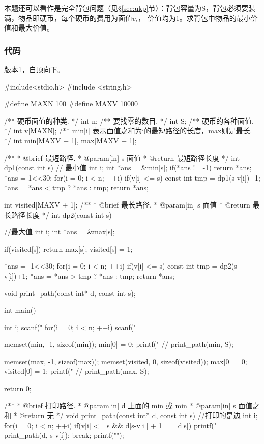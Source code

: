 本题还可以看作是完全背包问题（见\S \ref{sec:ukp}节）：背包容量为S，背包必须要装满，物品即硬币，每个硬币的费用为面值$v_i$，
价值均为1。求背包中物品的最小价值和最大价值。

\subsubsection{代码}
版本1，自顶向下。

\begin{Codex}[label=coin_change.c]
#include<stdio.h>
#include <string.h>

#define MAXN 100
#define MAXV 10000

/** 硬币面值的种类. */
int n;
/** 要找零的数目. */
int S;
/** 硬币的各种面值. */
int v[MAXN];
/** min[i] 表示面值之和为i的最短路径的长度，max则是最长. */
int min[MAXV + 1], max[MAXV + 1];

/**
 * @brief 最短路径.
 * @param[in] s 面值
 * @return 最短路径长度
 */
int dp1(const int s) { // 最小值
    int i;
    int *ans = &min[s];
    if(*ans != -1) return *ans;
    *ans = 1<<30;
    for(i = 0; i < n; ++i) if(v[i] <= s) {
        const int tmp = dp1(s-v[i])+1;
        *ans = *ans < tmp ? *ans : tmp;
    }
    return *ans;
}

int visited[MAXV + 1];
/**
 * @brief 最长路径.
 * @param[in] s 面值
 * @return 最长路径长度
 */
int dp2(const int s) { //最大值 
    int i;
    int *ans = &max[s];

    if(visited[s]) return max[s];
    visited[s] = 1;

    *ans = -1<<30;
    for(i = 0; i < n; ++i) if(v[i] <= s) {
        const int tmp = dp2(s-v[i])+1;
        *ans = *ans > tmp ? *ans : tmp;
    }
    return *ans;
}

void print_path(const int* d, const int s);

int main() {
    int i;
    scanf("%
    for(i = 0; i < n; ++i) scanf("%

    memset(min, -1, sizeof(min));
    min[0] = 0;
    printf("%
    // print_path(min, S);

    memset(max, -1, sizeof(max));
    memset(visited, 0, sizeof(visited));
    max[0] = 0; visited[0] = 1;
    printf("%
    // print_path(max, S);

    return 0;
}

/**
 * @brief 打印路径.
 * @param[in] d 上面的 min 或 min
 * @param[in] s 面值之和
 * @return 无
 */
void print_path(const int* d, const int s) {//打印的是边
    int i;
    for(i = 0; i < n; ++i) if(v[i] <= s && d[s-v[i]] + 1 == d[s]) {
        printf("%
        print_path(d, s-v[i]);
        break;
    }
    printf("\n");
}
\end{Codex}

